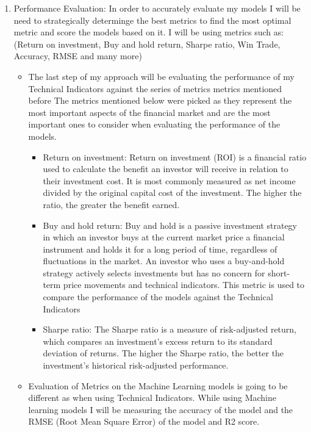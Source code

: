\documentclass{imc-inf}
\begin{document}
\begin{enumerate}
\begin{itemize}
		\end{itemize}
	\item Performance Evaluation: In order to accurately evaluate my models I will be need to strategically determinge the best
	metrics to find the most optimal metric and score the models based on it. I will be using metrics such as:
	(Return on investment, Buy and hold return, Sharpe ratio, Win Trade, Accuracy, RMSE and many more)
		\begin{itemize}
		\item  The last step of my approach will be evaluating the performance of my Technical Indicators against the series of metrics 
		metrics mentioned before
		The metrics mentioned below were picked as they represent the most important aspects of the financial market and are the most important
		ones to consider when evaluating the performance of the models.
			\begin{itemize}
				\item Return on investment: Return on investment (ROI) is a financial ratio used to calculate the benefit an investor will receive in relation to their investment cost.
				 It is most commonly measured as net income divided by the original capital cost of the investment. The higher the ratio, the greater the benefit earned.
				\item Buy and hold return: Buy and hold is a passive investment strategy in which an investor buys at the current market price a financial 
				instrument and holds it for a long period of time, regardless of fluctuations in the market. An investor who uses a
				buy-and-hold strategy actively selects investments but has no concern for short-term price movements and 
				technical indicators. This metric is used to compare the performance of the models against the Technical Indicators
				\item Sharpe ratio: The Sharpe ratio is a measure of risk-adjusted return, which compares an investment's excess return to its standard deviation of returns.
				The higher the Sharpe ratio, the better the investment's historical risk-adjusted performance.
			\end{itemize}
		\item Evaluation of Metrics on the Machine Learning models is going to be different \cite{evaluation_metrics} as when using Technical Indicators. 
		While using Machine learning models I will be measuring the accuracy of the model and the RMSE (Root Mean Square Error) of the model and R2 score.
			\begin{itemize}

\end{itemize}
\end{itemize}
\end{enumerate}
\end{document}
